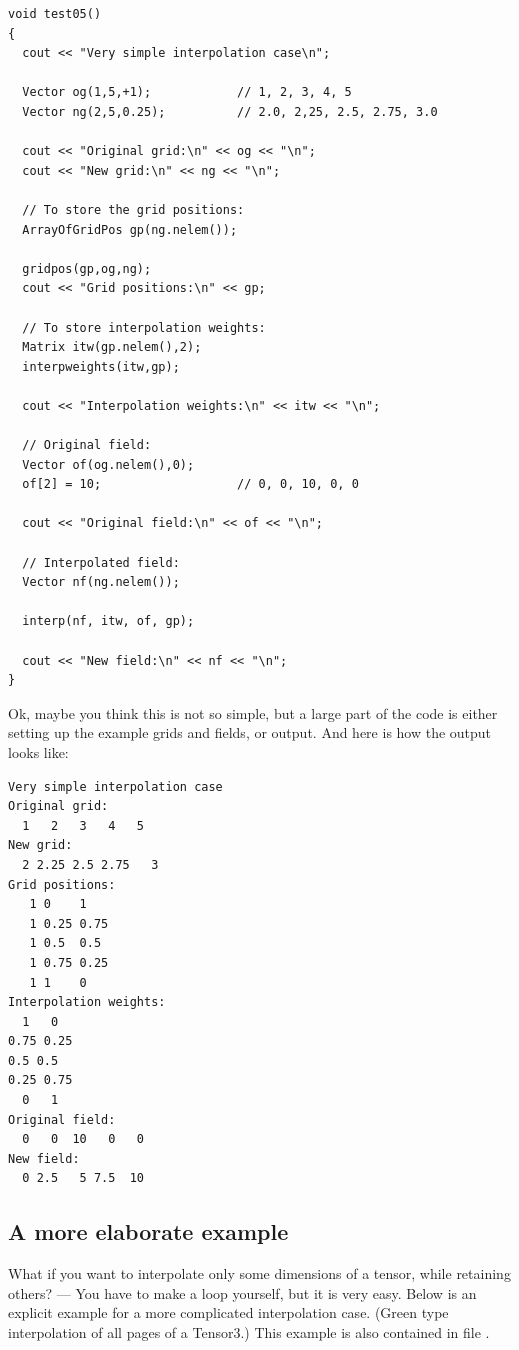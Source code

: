 \begin{lstlisting}
void test05()
{
  cout << "Very simple interpolation case\n";

  Vector og(1,5,+1);            // 1, 2, 3, 4, 5
  Vector ng(2,5,0.25);          // 2.0, 2,25, 2.5, 2.75, 3.0

  cout << "Original grid:\n" << og << "\n";
  cout << "New grid:\n" << ng << "\n";

  // To store the grid positions:
  ArrayOfGridPos gp(ng.nelem());

  gridpos(gp,og,ng);
  cout << "Grid positions:\n" << gp;

  // To store interpolation weights:
  Matrix itw(gp.nelem(),2);
  interpweights(itw,gp);
    
  cout << "Interpolation weights:\n" << itw << "\n";

  // Original field:
  Vector of(og.nelem(),0);
  of[2] = 10;                   // 0, 0, 10, 0, 0

  cout << "Original field:\n" << of << "\n";

  // Interpolated field:
  Vector nf(ng.nelem());

  interp(nf, itw, of, gp);

  cout << "New field:\n" << nf << "\n";
}
\end{lstlisting}

\hspace{-\parindent}Ok, maybe you think this is not so simple, but a
large part of the code is either setting up the example grids and
fields, or output. And here is how the output looks like:

\begin{lstlisting}
Very simple interpolation case
Original grid:
  1   2   3   4   5
New grid:
  2 2.25 2.5 2.75   3
Grid positions:
   1 0    1
   1 0.25 0.75
   1 0.5  0.5
   1 0.75 0.25
   1 1    0
Interpolation weights:
  1   0
0.75 0.25
0.5 0.5
0.25 0.75
  0   1
Original field:
  0   0  10   0   0
New field:
  0 2.5   5 7.5  10
\end{lstlisting}

\subsection{A more elaborate example}

What if you want to interpolate only some dimensions of a tensor,
while retaining others? --- You have to make a loop yourself, but it
is very easy. Below is an explicit example for a more complicated
interpolation case. (Green type interpolation of all pages of a
Tensor3.) This example is also contained in file
.

